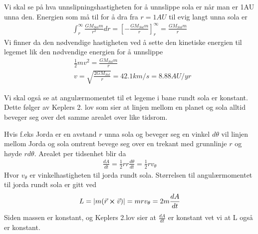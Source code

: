 \documentclass[reprint,english,notitlepage]{revtex4-1}
\begin{document}
	
	Vi skal se på hva unnslipningshastigheten for å unnslippe sola er når man er 1AU unna den. Energien som må til for å dra fra $r=1AU$ til evig langt unna sola er
	\begin{equation}
	\begin{aligned}
	\int_{r}^{\infty}\frac{GM_{Sol}m}{r^2}dr = [-\frac{GM_{Sol}m}{r}]_r^\infty = \frac{GM_{Sol}m}{r}
	\end{aligned}
	\end{equation}
	Vi finner da den nødvendige hastigheten ved å sette den kinetiske energien til legemet lik den nødvendige energien for å unnslippe
	\begin{equation}
	\label{eq:unn}
	\begin{aligned}
	&\frac{1}{2}m v^2  = \frac{GM_{Sol}m}{r} \\
	&v = \sqrt{\frac{2GM_{Sol}}{r}} = 42.1 km/s = 8.88AU/yr
	\end{aligned}
	\end{equation}
	
	Vi skal også se at angulærmomentet til et legeme i bane rundt sola er konstant. Dette følger av Keplers 2. lov som sier at linjen mellom en planet og sola alltid beveger seg over det samme arealet over like tidsrom.
	
	Hvis f.eks Jorda er en avstand $r$ unna sola og beveger seg en vinkel $d\theta$ vil linjen mellom Jorda og sola omtrent bevege seg over en trekant med grunnlinje $r$ og høyde $rd\theta$. Arealet per tidsenhet blir da
	\begin{equation}
	\begin{aligned}
	\frac{dA}{dt} = \frac{1}{2}r r \frac{d\theta}{dt} = \frac{1}{2}r v_{\theta}
	\end{aligned}
	\end{equation}
	Hvor $v_{\theta}$ er vinkelhastigheten til jorda rundt sola. Størrelsen til angulærmomentet til jorda rundt sola er gitt ved
	\begin{equation}
	\begin{aligned}
	L = |m(\vec{r} \cross \vec{v})| = mrv_\theta = 2 m \frac{dA}{dt}
	\end{aligned}
	\end{equation}
	Siden massen er konstant, og Keplers 2.lov sier at $\frac{dA}{dt}$ er konstant vet vi at L også er konstant.
	
\end{document}
